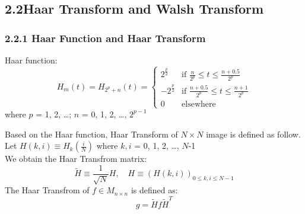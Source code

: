 \documentclass[12pt]{article}
\begin{document}
\subsection*{2.2\quad Haar Transform and Walsh Transform}

\subsubsection*{2.2.1 \quad Haar Function and Haar Transform}
Haar function:
    \begin{equation*}
            H_m(t) = H_{2^p+n}(t) = \begin{cases} 
                2^{\frac{p}{2}} & \text{if $\frac{n}{2^p} \leq t \leq \frac{n+0.5}{2^p}$} \\  
                -2^{\frac{p}{2}} & \text{if $\frac{n+0.5}{2^p} \leq t \leq \frac{n+1}{2^p}$} \\  
                0 & \text{elsewhere}  
                \end{cases}
    \end{equation*}
\hspace*{1cm} where $p$ = 1, 2, \ldots; $n$ = 0, 1, 2, \ldots, $2^{p-1}$
\begin{flushleft}
Based on the Haar function, Haar Transform of $N\times N$ image is defined as follow.\\
Let $H(k,i) \equiv H_{k}\left(\frac{i}{N}\right)$ where $k,i$ = 0, 1, 2, \ldots, $N$-1 \\
We obtain the Haar Transfrom matrix:
\begin{equation*}
 \tilde{H} \equiv\frac{1}{\sqrt{N}}H, \quad H \equiv(H (k,i))_{0\leqslant k,i \leqslant N-1}
\end{equation*}
The Haar Transfrom of $f \in M_{n\times n}$ is defined as:
\begin{equation*}
    g = \tilde{H}f\tilde{H}^T
\end{equation*}
\end{flushleft} 
\end{document}

